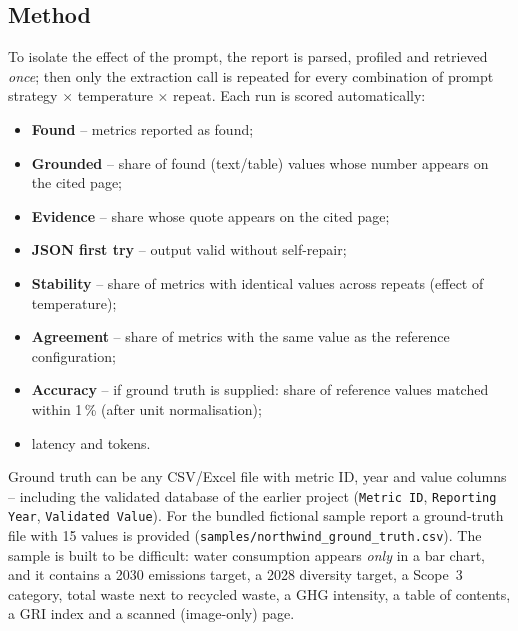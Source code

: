 \documentclass[11pt,a4paper]{article}
\newcommand{\code}[1]{\texttt{\small #1}}
\begin{document}
\subsection{Method}
To isolate the effect of the prompt, the report is parsed, profiled and retrieved \emph{once}; then only the
extraction call is repeated for every combination of prompt strategy $\times$ temperature $\times$ repeat.
Each run is scored automatically:
\begin{itemize}
  \item \textbf{Found} -- metrics reported as found;
  \item \textbf{Grounded} -- share of found (text/table) values whose number appears on the cited page;
  \item \textbf{Evidence} -- share whose quote appears on the cited page;
  \item \textbf{JSON first try} -- output valid without self-repair;
  \item \textbf{Stability} -- share of metrics with identical values across repeats (effect of temperature);
  \item \textbf{Agreement} -- share of metrics with the same value as the reference configuration;
  \item \textbf{Accuracy} -- if ground truth is supplied: share of reference values matched within 1\,\%
        (after unit normalisation);
  \item latency and tokens.
\end{itemize}
Ground truth can be any CSV/Excel file with metric ID, year and value columns -- including the validated
database of the earlier project (\code{Metric ID}, \code{Reporting Year}, \code{Validated Value}).
For the bundled fictional sample report a ground-truth file with 15 values is provided
(\nolinkurl{samples/northwind_ground_truth.csv}). The sample is built to be difficult: water consumption
appears \emph{only} in a bar chart, and it contains a 2030 emissions target, a 2028 diversity target,
a Scope~3 category, total waste next to recycled waste, a GHG intensity, a table of contents, a GRI index
and a scanned (image-only) page.
\end{document}
